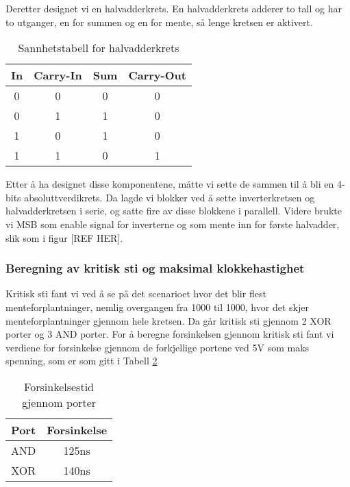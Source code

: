 
Deretter designet vi en halvadderkrets. En halvadderkrets adderer to tall og har to utganger, en for summen og en for mente, så lenge kretsen er aktivert.

\begin{table}[h]
  \centering
  \begin{tabular}{c c|c|c}

    In & Carry-In & Sum & Carry-Out\\
    \hline
    0 & 0 & 0 & 0\\
    0 & 1 & 1 & 0\\
    1 & 0 & 1 & 0\\
    1 & 1 & 0 & 1\\

  \end{tabular}
  \caption{Sannhetstabell for halvadderkrets}
  \label{tabell:2}
\end{table}


Etter å ha designet disse komponentene, måtte vi sette de sammen til å bli en 4-bits absoluttverdikrets.
Da lagde vi blokker ved å sette inverterkretsen og halvadderkretsen i serie, og satte fire av disse blokkene i parallell.
Videre brukte vi MSB som enable signal for inverterne og som mente inn for første halvadder, slik som i figur [REF HER].

\subsubsection*{Beregning av kritisk sti og maksimal klokkehastighet}

Kritisk sti fant vi ved å se på det scenarioet hvor det blir flest menteforplantninger, nemlig overgangen fra 1000 til 1000, hvor det skjer menteforplantninger gjennom hele kretsen.
Da går kritisk sti gjennom 2 XOR porter og 3 AND porter.
For å beregne forsinkelsen gjennom kritisk sti fant vi verdiene for forsinkelse gjennom de forkjellige portene ved 5V som maks spenning, som er som gitt i Tabell \ref{tabell:3}

\begin{table}[h]
  \centering
  \begin{tabular}{c c}

    Port & Forsinkelse\\
    \hline
    AND & 125ns\\
    XOR & 140ns\\

  \end{tabular}
  \caption{Forsinkelsestid gjennom porter}
  \label{tabell:3}
\end{table}

